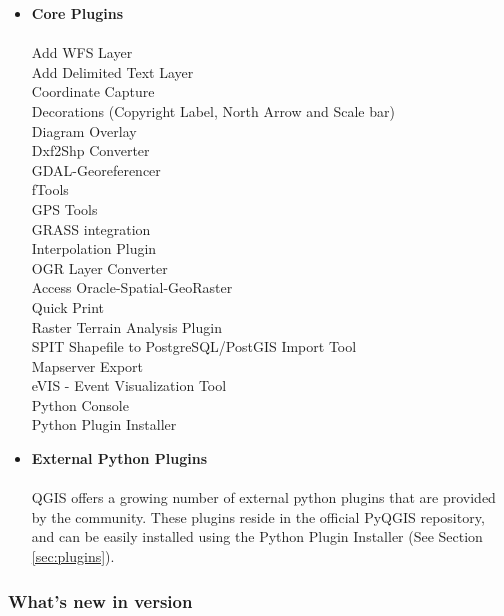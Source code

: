 \begin{itemize}
\item \textbf{Core Plugins}
\\ \\ Add WFS Layer
\\ Add Delimited Text Layer
\\ Coordinate Capture
\\ Decorations (Copyright Label, North Arrow and Scale bar)
\\ Diagram Overlay
\\ Dxf2Shp Converter
\\ GDAL-Georeferencer
\\ fTools
\\ GPS Tools
\\ GRASS integration
\\ Interpolation Plugin
\\ OGR Layer Converter
\\ Access Oracle-Spatial-GeoRaster
\\ Quick Print
\\ Raster Terrain Analysis Plugin
\\ SPIT Shapefile to PostgreSQL/PostGIS Import Tool
\\ Mapserver Export
\\ eVIS - Event Visualization Tool
\\ Python Console
\\ Python Plugin Installer
\\ \item \textbf{External Python Plugins}
\\ \\ QGIS offers a growing number of external python plugins that are 
provided by the community. These plugins reside in the official
PyQGIS repository, and can be easily installed using the Python Plugin 
Installer (See Section \ref{sec:plugins}).
\end{itemize}

\subsubsection{What's new in version \CURRENT} 

